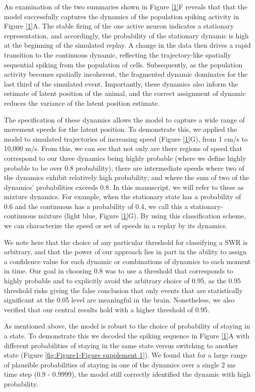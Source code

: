 \documentclass[times, twoside]{zHenriquesLab-StyleBioRxiv}
\begin{document}
An examination of the two summaries shown in Figure \ref{1}F reveals that that the model successfully captures the dynamics of the population spiking activity in Figure \ref{1}A. The stable firing of the one active neuron indicates a stationary representation, and accordingly, the probability of the stationary dynamic is high at the beginning of the simulated replay. A change in the data then drives a rapid transition to the continuous dynamic, reflecting the trajectory-like spatially sequential spiking from the population of cells. Subsequently, as the population activity becomes spatially incoherent, the fragmented dynamic dominates for the last third of the simulated event. Importantly, these dynamics also inform the estimate of latent position of the animal, and the correct assignment of dynamic reduces the variance of the latent position estimate.

The specification of these dynamics allows the model to capture a wide range of movement speeds for the latent position. To demonstrate this, we applied the model to simulated trajectories of increasing speed (Figure \ref{1}G), from 1 cm/s to 10,000 m/s. From this, we can see that not only are there regions of speed that correspond to our three dynamics being highly probable (where we define highly probable to be over 0.8 probability), there are intermediate speeds where two of the dynamics exhibit relatively high probability; and where the sum of two of the dynamics' probabilities exceeds 0.8. In this manuscript, we will refer to these as mixture dynamics. For example, when the stationary state has a probability of 0.6 and the continuous has a probability of 0.4, we call this a stationary-continuous mixture (light blue, Figure \ref{1}G). By using this classification scheme, we can characterize the speed or set of speeds in a replay by its dynamics.

We note here that the choice of any particular threshold for classifying a SWR is arbitrary, and that the power of our approach lies in part in the ability to assign a confidence value for each dynamic or combinations of dynamics to each moment in time. Our goal in choosing 0.8 was to use a threshold that corresponds to highly probable and to explicitly avoid the arbitrary choice of 0.95, as the 0.95 threshold risks giving the false conclusion that only events that are statistically significant at the 0.05 level are meaningful in the brain. Nonetheless, we also verified that our central results hold with a higher threshold of 0.95. 

As mentioned above, the model is robust to the choice of probability of staying in a state. To demonstrate this we decoded the spiking sequence in Figure \ref{1}A with different probabilities of staying in the same state versus switching to another state (Figure \ref{fig:Figure1-Figure supplement 1}). We found that for a large range of plausible probabilities of staying in one of the dynamics over a single 2 ms time step (0.9 - 0.9999), the model still correctly identified the dynamic with high probability.
\end{document}
